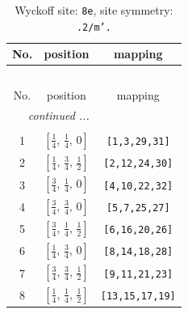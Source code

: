 \documentclass[fleqn,8pt]{jsarticle}
\begin{document}
\begin{longtable}{ccc}
\caption{Wyckoff site: {\tt 8e}, site symmetry: {\tt .2/m'.}}
 \\
 \hline \hline
No. & position & mapping \\ \hline \endfirsthead

\multicolumn{2}{l}{\tablename\ \thetable{}} \\
 \hline \hline
No. & position & mapping \\ \hline \endhead

 \hline \hline
\multicolumn{2}{r}{\footnotesize\it continued ...} \\ \endfoot

 \hline \hline
\multicolumn{2}{r}{} \\ \endlastfoot

1 & $\left[ \frac{1}{4},\, \frac{1}{4},\, 0 \right]$ & {\tt [1,3,29,31]} \\ \hline
2 & $\left[ \frac{1}{4},\, \frac{3}{4},\, \frac{1}{2} \right]$ & {\tt [2,12,24,30]} \\ \hline
3 & $\left[ \frac{3}{4},\, \frac{1}{4},\, 0 \right]$ & {\tt [4,10,22,32]} \\ \hline
4 & $\left[ \frac{3}{4},\, \frac{3}{4},\, 0 \right]$ & {\tt [5,7,25,27]} \\ \hline
5 & $\left[ \frac{3}{4},\, \frac{1}{4},\, \frac{1}{2} \right]$ & {\tt [6,16,20,26]} \\ \hline
6 & $\left[ \frac{1}{4},\, \frac{3}{4},\, 0 \right]$ & {\tt [8,14,18,28]} \\ \hline
7 & $\left[ \frac{3}{4},\, \frac{3}{4},\, \frac{1}{2} \right]$ & {\tt [9,11,21,23]} \\ \hline
8 & $\left[ \frac{1}{4},\, \frac{1}{4},\, \frac{1}{2} \right]$ & {\tt [13,15,17,19]} \\
\end{longtable}
\renewcommand{\arraystretch}{1.2}
\end{document}
